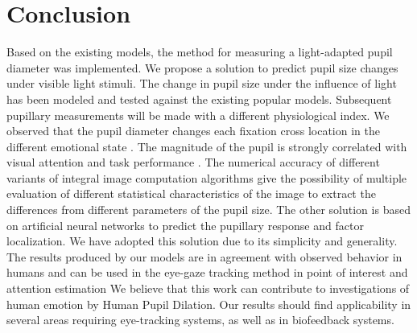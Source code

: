 \documentclass[USenglish,twocolumn]{article}
\begin{document}
\section{Conclusion}
Based on the existing models, the method for measuring a light-adapted pupil diameter was implemented. We propose a solution to predict pupil size changes under visible light stimuli. The change in pupil size under the influence of light has been modeled and tested against the existing popular models. 
Subsequent pupillary measurements will be made with a different physiological index. We observed that the pupil diameter changes each fixation cross location in the different emotional state \cite{Raiturkar}. The magnitude of the pupil is strongly correlated with visual attention and task performance \cite{Ebitz}. The numerical accuracy of different variants of integral image computation algorithms give the possibility of multiple evaluation of different statistical characteristics of the image \cite{Puchala} to extract the differences from different parameters of the pupil size. 
The other solution is based on artificial neural networks \cite{Garbaa} \cite{Lipinski} to predict the pupillary response and factor localization. We have adopted this solution due to its simplicity and generality. The results produced by our models are in agreement with observed behavior in humans and can be used in the eye-gaze tracking method in point of interest and attention estimation
We believe that this work can contribute to investigations of human emotion by Human Pupil Dilation. Our results should find applicability in several areas requiring eye-tracking systems, as well as in biofeedback systems. 
\end{document}
